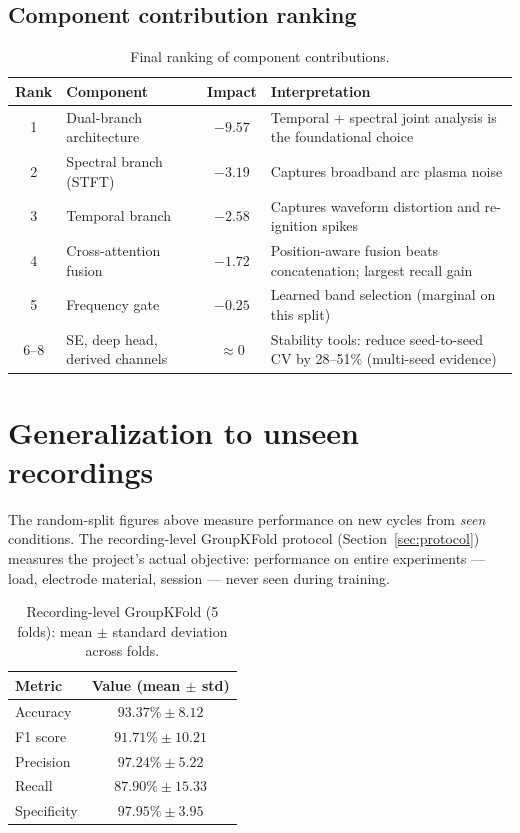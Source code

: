 \subsection{Component contribution ranking}

\begin{table}[H]
\centering
\caption{Final ranking of component contributions.}
\label{tab:ranking}
\renewcommand{\arraystretch}{1.3}
\small
\begin{tabular}{|c|l|c|p{5.6cm}|}
\hline
\textbf{Rank} & \textbf{Component} & \textbf{Impact} & \textbf{Interpretation} \\
\hline
1 & Dual-branch architecture & $-9.57$ & Temporal + spectral joint analysis is the foundational choice \\
\hline
2 & Spectral branch (STFT) & $-3.19$ & Captures broadband arc plasma noise \\
\hline
3 & Temporal branch & $-2.58$ & Captures waveform distortion and re-ignition spikes \\
\hline
4 & Cross-attention fusion & $-1.72$ & Position-aware fusion beats concatenation; largest recall gain \\
\hline
5 & Frequency gate & $-0.25$ & Learned band selection (marginal on this split) \\
\hline
6--8 & SE, deep head, derived channels & $\approx 0$ & Stability tools: reduce seed-to-seed CV by 28--51\% (multi-seed evidence) \\
\hline
\end{tabular}
\end{table}

\section{Generalization to unseen recordings}
\label{sec:generalization}

The random-split figures above measure performance on new cycles from \emph{seen} conditions. The recording-level GroupKFold protocol (Section~\ref{sec:protocol}) measures the project's actual objective: performance on entire experiments --- load, electrode material, session --- never seen during training.

\begin{table}[H]
\centering
\caption{Recording-level GroupKFold (5 folds): mean $\pm$ standard deviation across folds.}
\label{tab:groupkfold}
\renewcommand{\arraystretch}{1.25}
\small
\begin{tabular}{|l|c|}
\hline
\textbf{Metric} & \textbf{Value (mean $\pm$ std)} \\
\hline
Accuracy & $93.37\% \pm 8.12$ \\
\hline
F1 score & $91.71\% \pm 10.21$ \\
\hline
Precision & $97.24\% \pm 5.22$ \\
\hline
Recall & $87.90\% \pm 15.33$ \\
\hline
Specificity & $97.95\% \pm 3.95$ \\
\hline
\end{tabular}
\end{table}

